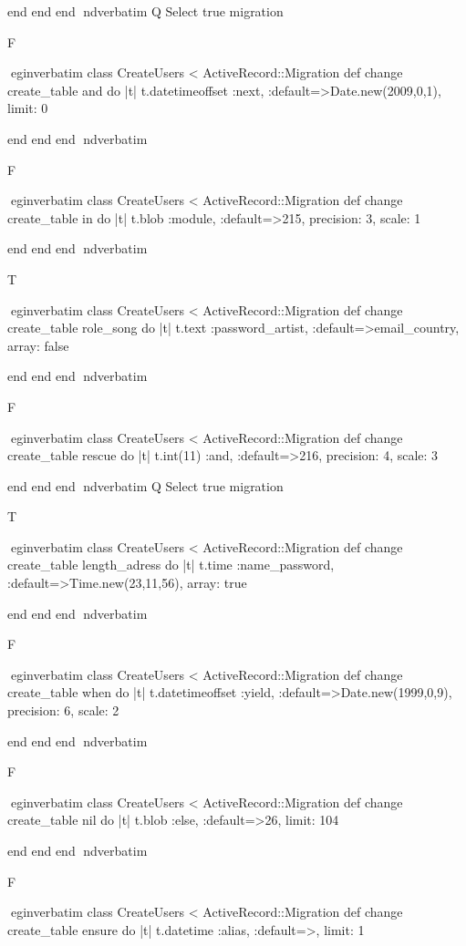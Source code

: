     end 
  end 
end
nd{verbatim}
Q
 Select true migration

F

egin{verbatim}
 class CreateUsers < ActiveRecord::Migration 
  def change 
    create_table and do |t| 
      t.datetimeoffset :next, :default=>Date.new(2009,0,1), limit: 0
    
    end 
  end 
end
nd{verbatim}

F

egin{verbatim}
 class CreateUsers < ActiveRecord::Migration 
  def change 
    create_table in do |t| 
      t.blob :module, :default=>215, precision: 3, scale: 1
    
    end 
  end 
end
nd{verbatim}

T

egin{verbatim}
 class CreateUsers < ActiveRecord::Migration 
  def change 
    create_table role_song do |t| 
      t.text :password_artist, :default=>email_country, array: false
    
    end 
  end 
end
nd{verbatim}

F

egin{verbatim}
 class CreateUsers < ActiveRecord::Migration 
  def change 
    create_table rescue do |t| 
      t.int(11) :and, :default=>216, precision: 4, scale: 3
    
    end 
  end 
end
nd{verbatim}
Q
 Select true migration

T

egin{verbatim}
 class CreateUsers < ActiveRecord::Migration 
  def change 
    create_table length_adress do |t| 
      t.time :name_password, :default=>Time.new(23,11,56), array: true
    
    end 
  end 
end
nd{verbatim}

F

egin{verbatim}
 class CreateUsers < ActiveRecord::Migration 
  def change 
    create_table when do |t| 
      t.datetimeoffset :yield, :default=>Date.new(1999,0,9), precision: 6, scale: 2
    
    end 
  end 
end
nd{verbatim}

F

egin{verbatim}
 class CreateUsers < ActiveRecord::Migration 
  def change 
    create_table nil do |t| 
      t.blob :else, :default=>26, limit: 104
    
    end 
  end 
end
nd{verbatim}

F

egin{verbatim}
 class CreateUsers < ActiveRecord::Migration 
  def change 
    create_table ensure do |t| 
      t.datetime :alias, :default=>, limit: 1
    
